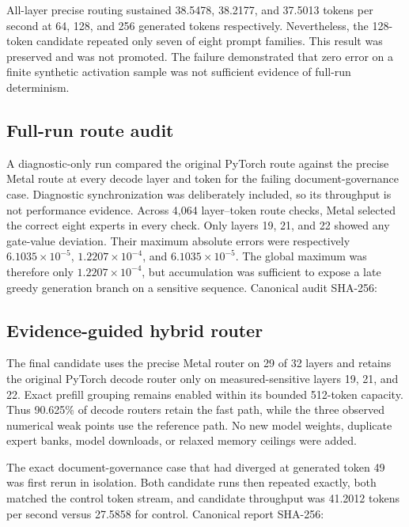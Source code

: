 All-layer precise routing sustained 38.5478, 38.2177, and 37.5013 tokens per
second at 64, 128, and 256 generated tokens respectively.  Nevertheless, the
128-token candidate repeated only seven of eight prompt families.  This result
was preserved and was not promoted.  The failure demonstrated that zero error
on a finite synthetic activation sample was not sufficient evidence of full-run
determinism.

\subsection{Full-run route audit}

A diagnostic-only run compared the original PyTorch route against the precise
Metal route at every decode layer and token for the failing document-governance
case.  Diagnostic synchronization was deliberately included, so its throughput
is not performance evidence.  Across 4,064 layer--token route checks, Metal
selected the correct eight experts in every check.  Only layers 19, 21, and 22
showed any gate-value deviation.  Their maximum absolute errors were respectively
$6.1035\times10^{-5}$, $1.2207\times10^{-4}$, and
$6.1035\times10^{-5}$.  The global maximum was therefore only
$1.2207\times10^{-4}$, but accumulation was sufficient to expose a late greedy
generation branch on a sensitive sequence.  Canonical audit SHA-256:

\subsection{Evidence-guided hybrid router}

The final candidate uses the precise Metal router on 29 of 32 layers and retains
the original PyTorch decode router only on measured-sensitive layers 19, 21,
and 22.  Exact prefill grouping remains enabled within its bounded 512-token
capacity.  Thus 90.625\% of decode routers retain the fast path, while the three
observed numerical weak points use the reference path.  No new model weights,
duplicate expert banks, model downloads, or relaxed memory ceilings were added.

The exact document-governance case that had diverged at generated token 49 was
first rerun in isolation.  Both candidate runs then repeated exactly, both
matched the control token stream, and candidate throughput was 41.2012 tokens
per second versus 27.5858 for control.  Canonical report SHA-256:

